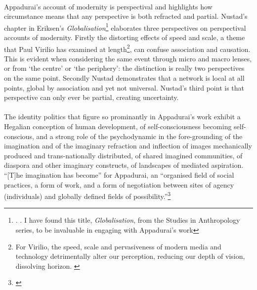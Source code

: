 \documentclass{article}
\begin{document}
\paragraph{}Appadurai's account of modernity is perspectival and highlights how circumstance means that any perspective is both refracted and partial. Nustad's chapter in Eriksen's \emph{Globalisation}\footnote{\cite[p.122-137]{Nustad:2003}. \cite{Eriksen:2003gl}. I have found this title, \emph{Globalisation}, from the Studies in Anthropology series, to be invaluable in engaging with Appadurai's work} elaborates three perspectives on perspectival accounts of modernity. Firstly the distorting effects of speed and scale, a theme that Paul Virilio has examined at length\footnote{For Virilio, the speed, scale and pervasiveness of modern media and technology detrimentally alter our perception, reducing our depth of vision, dissolving horizon. \cite{Virilio:2005jl,Virilio:2006sp}}, can confuse association and causation. This is evident when considering the same event through micro and macro lenses, or from `the centre' or `the periphery': the distinction is really two perspectives on the same point. Secondly Nustad demonstrates that a network is local at all points, global by association and yet not universal. Nustad's third point is that perspective can only ever be partial, creating uncertainty.

\paragraph{}The identity politics that figure so prominantly in Appadurai's work exhibit a Hegalian conception of human development, of self-consciousness becoming self-conscious, and a strong role of the psychodynamic in the fore-grounding of the imagination and of the imaginary refraction and inflection of images mechanically produced and trans-nationally distributed, of shared imagined communities, of diaspora and other imaginary constructs, of landscapes of mediated aspiration. ``[T]he imagination has become'' for Appadurai, an ``organised field of social practices, a form of work, and a form of negotiation between sites of agency (individuals) and globally defined fields of possibility.''\footnote{\cite[p.31]{Appadurai:1996lp}}
\end{document}
